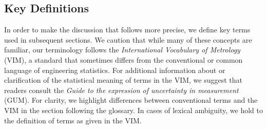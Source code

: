 \subsection{Key Definitions}

In order to make the discussion that follows more precise, we define key terms used in subsequent sections.
We caution that while many of these concepts are familiar, our terminology follows the {\it International Vocabulary of Metrology} (VIM)\citep{JCGM:VIM2012}, a standard that sometimes differs from the conventional or common language of engineering statistics. 
For additional information about or clarification of the statistical meaning of terms in the VIM, we suggest that readers consult the {\it Guide to the expression of uncertainty in measurement} (GUM)\citep{JCGM:GUM2008}.
For clarity, we highlight differences between conventional terms and the VIM in the section following the glossary.
In cases of lexical ambiguity, we hold to the definition of terms as given in the VIM.




